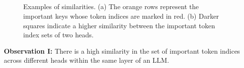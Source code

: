 \subsection{\techA{}}

\label{sec:techa}

\begin{figure}
	\centering
	\hspace{0.06in}
	\vspace{-0.1in}
	\caption{Examples of similarities. (a) The orange rows represent the important keys whose token indices are marked in red. (b) Darker squares indicate a higher similarity between the important token index sets of two heads.}
	\vspace{-0.1in}
\end{figure}




\noindent
\textbf{Observation I:}{
	There is a high similarity in the set of important token indices 
	across different heads within the same layer of an LLM.
}


